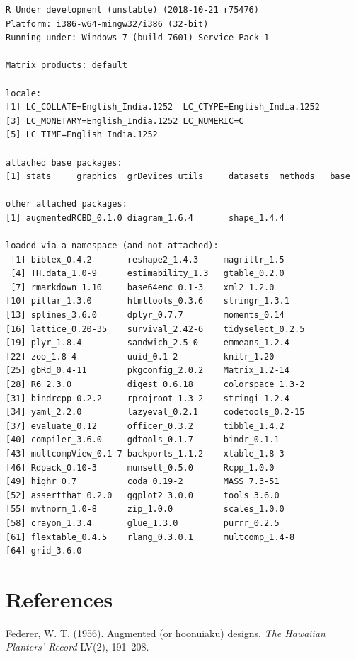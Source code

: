 \begin{verbatim}
R Under development (unstable) (2018-10-21 r75476)
Platform: i386-w64-mingw32/i386 (32-bit)
Running under: Windows 7 (build 7601) Service Pack 1

Matrix products: default

locale:
[1] LC_COLLATE=English_India.1252  LC_CTYPE=English_India.1252   
[3] LC_MONETARY=English_India.1252 LC_NUMERIC=C                  
[5] LC_TIME=English_India.1252    

attached base packages:
[1] stats     graphics  grDevices utils     datasets  methods   base     

other attached packages:
[1] augmentedRCBD_0.1.0 diagram_1.6.4       shape_1.4.4        

loaded via a namespace (and not attached):
 [1] bibtex_0.4.2       reshape2_1.4.3     magrittr_1.5      
 [4] TH.data_1.0-9      estimability_1.3   gtable_0.2.0      
 [7] rmarkdown_1.10     base64enc_0.1-3    xml2_1.2.0        
[10] pillar_1.3.0       htmltools_0.3.6    stringr_1.3.1     
[13] splines_3.6.0      dplyr_0.7.7        moments_0.14      
[16] lattice_0.20-35    survival_2.42-6    tidyselect_0.2.5  
[19] plyr_1.8.4         sandwich_2.5-0     emmeans_1.2.4     
[22] zoo_1.8-4          uuid_0.1-2         knitr_1.20        
[25] gbRd_0.4-11        pkgconfig_2.0.2    Matrix_1.2-14     
[28] R6_2.3.0           digest_0.6.18      colorspace_1.3-2  
[31] bindrcpp_0.2.2     rprojroot_1.3-2    stringi_1.2.4     
[34] yaml_2.2.0         lazyeval_0.2.1     codetools_0.2-15  
[37] evaluate_0.12      officer_0.3.2      tibble_1.4.2      
[40] compiler_3.6.0     gdtools_0.1.7      bindr_0.1.1       
[43] multcompView_0.1-7 backports_1.1.2    xtable_1.8-3      
[46] Rdpack_0.10-3      munsell_0.5.0      Rcpp_1.0.0        
[49] highr_0.7          coda_0.19-2        MASS_7.3-51       
[52] assertthat_0.2.0   ggplot2_3.0.0      tools_3.6.0       
[55] mvtnorm_1.0-8      zip_1.0.0          scales_1.0.0      
[58] crayon_1.3.4       glue_1.3.0         purrr_0.2.5       
[61] flextable_0.4.5    rlang_0.3.0.1      multcomp_1.4-8    
[64] grid_3.6.0        
\end{verbatim}

\hypertarget{references}{%
\section*{References}\label{references}}

\hypertarget{refs}{}
\leavevmode\hypertarget{ref-federer_augmented_1956}{}%
Federer, W. T. (1956). Augmented (or hoonuiaku) designs. \emph{The
Hawaiian Planters' Record} LV(2), 191--208.

